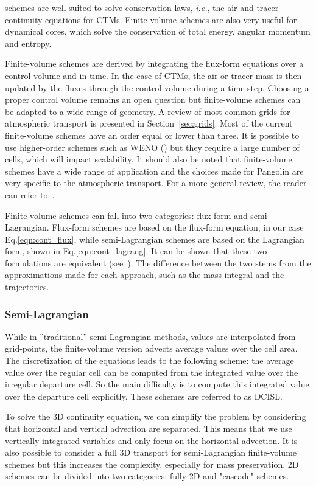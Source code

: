 \DIFaddend schemes are well-suited to solve conservation laws, \textit{i.e.},
the air and tracer continuity equations for CTMs. Finite-volume schemes are also
very useful for dynamical cores, which solve the conservation of total energy,
angular momentum and entropy.

Finite-volume schemes are derived by integrating the flux-form equations over a
control volume and in time. In the case of CTMs, the air or tracer mass is then
updated by the fluxes through the control volume during a time-step. Choosing a
proper control volume remains an open question but finite-volume schemes can be
adapted to a wide range of geometry. A review of most common grids for
atmospheric transport is presented in Section~\ref{sec:grids}.
Most of the current finite-volume schemes have an order equal or lower than
three. It is possible to use higher-order schemes such as WENO
(\cite{Jiang1999}) but they require a large number of cells, which will impact
scalability. It should also be noted that finite-volume schemes have a wide
range of application and the choices made for Pangolin are very specific to the
atmospheric transport. For a more general review, the reader can refer
to~\cite{LeVeque2002}.

Finite-volume schemes can fall into two categories: flux-form and
semi-Lagrangian. Flux-form schemes are based on the flux-form equation, in our
case Eq.\eqref{eqn:cont_flux}, while semi-Lagrangian schemes are based on the
Lagrangian form, shown in Eq.\eqref{eqn:cont_lagrang}. It can be shown that
these two formulations are equivalent (see~\cite{Machenhauer2009}). The
difference between the two stems from the approximations made for each approach,
such as the mass integral and the trajectories.

\subsubsection{Semi-Lagrangian }
\label{subsub:cisl}
While in ''traditional'' semi-Lagrangian methods, values are interpolated from
grid-points, the finite-volume version advects average values over the cell
area. The discretization of the equations leads to the following scheme: the
average value over the regular cell can be computed from the integrated value
over the irregular departure cell. So the main difficulty is to compute this
integrated value over the departure cell explicitly. These schemes are referred
to as \gls{DCISL}. 

To solve the 3D continuity equation, we can simplify the problem by considering
that horizontal and vertical advection are separated. This means that we use
vertically integrated variables and only focus on the horizontal advection. It
is also possible to consider a full 3D transport for semi-Lagrangian
finite-volume schemes but this increases the complexity, especially for
mass preservation. 2D schemes can be divided into two categories: fully 2D and
"cascade" schemes.

